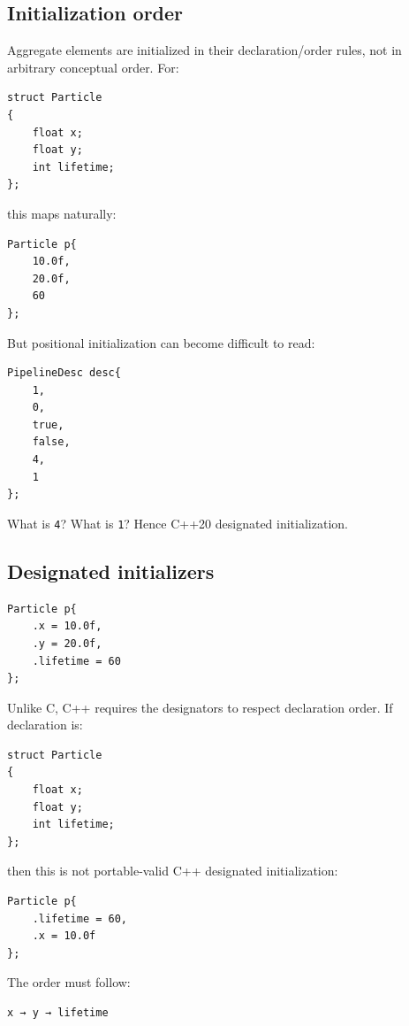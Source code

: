 \subsection{Initialization order}\label{05-engine-i-ch003-initialization-order}

Aggregate elements are initialized in their declaration/order rules, not in arbitrary conceptual order. For:

\begin{verbatim}
struct Particle
{
    float x;
    float y;
    int lifetime;
};
\end{verbatim}

this maps naturally:

\begin{verbatim}
Particle p{
    10.0f,
    20.0f,
    60
};
\end{verbatim}

But positional initialization can become difficult to read:

\begin{verbatim}
PipelineDesc desc{
    1,
    0,
    true,
    false,
    4,
    1
};
\end{verbatim}

What is \texttt{4}? What is \texttt{1}? Hence C++20 designated initialization.

\subsection{Designated initializers}\label{05-engine-i-ch003-designated-initializers}

\begin{verbatim}
Particle p{
    .x = 10.0f,
    .y = 20.0f,
    .lifetime = 60
};
\end{verbatim}

Unlike C, C++ requires the designators to respect declaration order. If declaration is:

\begin{verbatim}
struct Particle
{
    float x;
    float y;
    int lifetime;
};
\end{verbatim}

then this is not portable-valid C++ designated initialization:

\begin{verbatim}
Particle p{
    .lifetime = 60,
    .x = 10.0f
};
\end{verbatim}

The order must follow:

\begin{verbatim}
x → y → lifetime
\end{verbatim}

